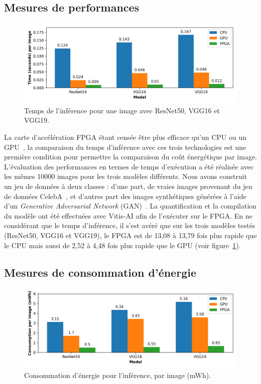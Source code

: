 \subsection{Mesures de performances}

\begin{figure}[!ht]
    \centering
    \includegraphics[width=0.7\columnwidth]{4_Chapitre4/figures/characterization/time_of_inference_1_image.png}
    \caption{Temps de l'inférence pour une image avec ResNet50, VGG16 et VGG19.}
    \label{figure:herofake-time-inference}
\end{figure}

La carte d'accélération \gls{FPGA} étant censée être plus efficace qu'un \gls{CPU} ou un \gls{GPU}~\cite{5272532}, la comparaison du temps d'inférence avec ces trois technologies est une première condition pour permettre la comparaison du coût énergétique par image. L'évaluation des performances en termes de temps d'exécution a été réalisée avec les mêmes 10000 images pour les trois modèles différents. Nous avons construit un jeu de données à deux classes : d'une part, de vraies images provenant du jeu de données CelebA~\cite{https://doi.org/10.48550/arxiv.1411.7766}, et d'autres part des images synthétiques générées à l'aide d'un \textit{Generative Adversarial Network} (GAN)~\cite{jimaging7080128}. La quantification et la compilation du modèle ont été effectuées avec Vitis-AI afin de l'exécuter sur le \gls{FPGA}. En ne considérant que le temps d'inférence, il s'est avéré que sur les trois modèles testés (ResNet50, VGG16 et VGG19), le \gls{FPGA} est de 13,08 à 13,79 fois plus rapide que le \gls{CPU} mais aussi de 2,52 à 4,48 fois plus rapide que le \gls{GPU} (voir figure~\ref{figure:herofake-time-inference}).

\subsection{Mesures de consommation d'énergie}

\begin{figure}[!ht]
    \centering
    \includegraphics[width=0.7\columnwidth]{4_Chapitre4/figures/characterization/consumption_per_image.png}
    \caption{Consommation d'énergie pour l'inférence, par image (mWh).}
    \label{figure:herofake-consumption-per-image}
\end{figure}

